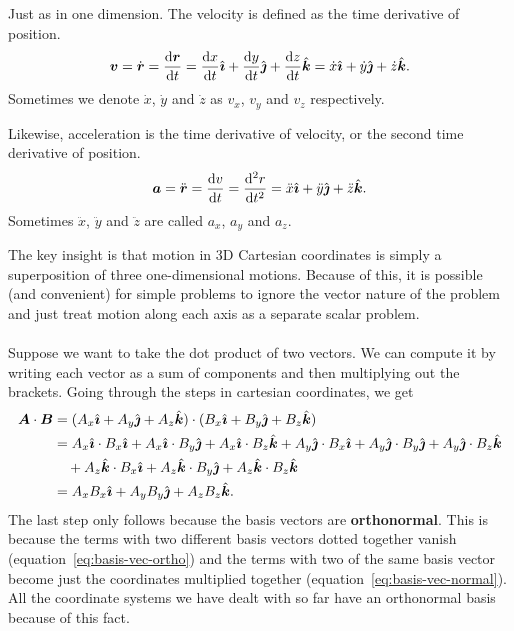 \documentclass[../classical_mechanics.tex]{subfiles}
\begin{document}
        \begin{definition}
            Just as in one dimension.
            The velocity is defined as the time derivative of position.
            \begin{equation}
                \vec{v}=\dot{\vec{r}}=\dv{\vec{r}}{t}=\dv{x}{t}\ihat+\dv{y}{t}\jhat+\dv{z}{t}\khat=\dot{x}\ihat+\dot{y}\jhat+\dot{z}\khat.
            \end{equation}
            Sometimes we denote $\dot{x}$, $\dot{y}$ and $\dot{z}$ as $v_x$, $v_y$ and $v_z$ respectively.
        \end{definition}
        \begin{definition}
            Likewise, acceleration is the time derivative of velocity, or the second time derivative of position.
            \begin{equation}
                \vec{a}=\ddot{\vec{r}}=\dv{v}{t}=\dv[2]{r}{t}=\ddot{x}\ihat+\ddot{y}\jhat+\ddot{z}\khat.
            \end{equation}
            Sometimes $\ddot{x}$, $\ddot{y}$ and $\ddot{z}$ are called $a_x$, $a_y$ and $a_z$.
        \end{definition}
        The key insight is that motion in 3D Cartesian coordinates is simply a superposition of three one-dimensional motions.
        Because of this, it is possible (and convenient) for simple problems to ignore the vector nature of the problem and just treat motion along each axis as a separate scalar problem.
        
        \paragraph{}
        Suppose we want to take the dot product of two vectors.
        We can compute it by writing each vector as a sum of components and then multiplying out the brackets.
        Going through the steps in cartesian coordinates, we get
        \begin{align}
            \boldsymbol{A}\cdot\boldsymbol{B}&=(A_x\hat{\boldsymbol{\imath}}+A_y\hat{\boldsymbol{\jmath}}+A_z\hat{\boldsymbol{k}})\cdot(B_x\hat{\boldsymbol{\imath}}+B_y\hat{\boldsymbol{\jmath}}+B_z\hat{\boldsymbol{k}})\\
            &\begin{aligned}
                &=A_x\hat{\boldsymbol{\imath}}\cdot B_x\hat{\boldsymbol{\imath}}+A_x\hat{\boldsymbol{\imath}}\cdot B_y\hat{\boldsymbol{\jmath}}+A_x\hat{\boldsymbol{\imath}}\cdot B_z\hat{\boldsymbol{k}}+A_y\hat{\boldsymbol{\jmath}}\cdot B_x\hat{\boldsymbol{\imath}}+A_y\hat{\boldsymbol{\jmath}}\cdot B_y\hat{\boldsymbol{\jmath}}+A_y\hat{\boldsymbol{\jmath}}\cdot B_z\hat{\boldsymbol{k}}\\
                &\quad+A_z\hat{\boldsymbol{k}}\cdot B_x\hat{\boldsymbol{\imath}}+A_z\hat{\boldsymbol{k}}\cdot B_y\hat{\boldsymbol{\jmath}}+A_z\hat{\boldsymbol{k}}\cdot B_z\hat{\boldsymbol{k}}
            \end{aligned}\\
            &=A_xB_x\hat{\boldsymbol{\imath}}+A_yB_y\hat{\boldsymbol{\jmath}}+A_zB_z\hat{\boldsymbol{k}}.
        \end{align}
        The last step only follows because the basis vectors are \textbf{orthonormal}.
        This is because the terms with two different basis vectors dotted together vanish (equation~\ref{eq:basis-vec-ortho}) and the terms with two of the same basis vector become just the coordinates multiplied together (equation~\ref{eq:basis-vec-normal}).
        All the coordinate systems we have dealt with so far have an orthonormal basis because of this fact.
\end{document}
